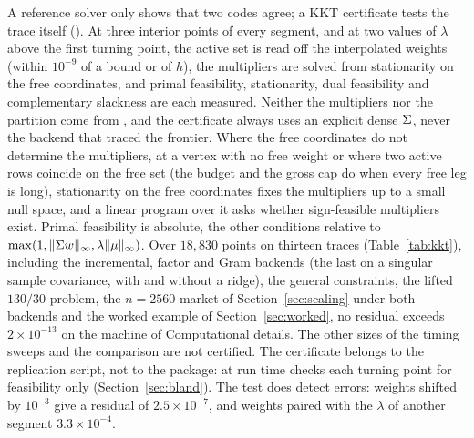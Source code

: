 A reference solver only shows that two codes agree; a KKT certificate tests the trace
itself (). At three interior points of every segment, and at two
values of $\lambda$ above the first turning point, the active set is read off the
interpolated weights (within $10^{-9}$ of a bound or of $h$), the multipliers are solved
from stationarity on the free coordinates, and primal feasibility, stationarity, dual
feasibility and complementary slackness are each measured. Neither the multipliers nor
the partition come from , and the certificate always uses an explicit dense
$\Sigma$, never the backend that traced the frontier. Where the free coordinates do not
determine the multipliers, at a vertex with no free weight or where two active rows
coincide on the free set (the budget and the gross cap do when every free leg is long),
stationarity on the free coordinates fixes the multipliers up to a small null space, and
a linear program over it asks whether sign-feasible multipliers exist. Primal feasibility
is absolute, the other conditions relative to $\max(1, \lVert\Sigma w\rVert_\infty,
\lambda\lVert\mu\rVert_\infty)$. Over $18{,}830$ points on thirteen traces
(Table~\ref{tab:kkt}), including the incremental, factor and Gram backends (the last on a
singular sample covariance, with and without a ridge), the general
constraints, the lifted $130/30$ problem, the $n=2560$ market of
Section~\ref{sec:scaling} under both backends and the worked example of
Section~\ref{sec:worked}, no residual exceeds $2\times10^{-13}$ on the machine of
Computational details. The other sizes of the timing sweeps and the 
comparison are not certified. The certificate belongs to the replication script, not to the package: at run
time  checks each turning point for feasibility only
(Section~\ref{sec:bland}). The
test does detect errors: weights shifted by $10^{-3}$ give a residual of
$2.5\times10^{-7}$, and weights paired with the $\lambda$ of another segment
$3.3\times10^{-4}$.

